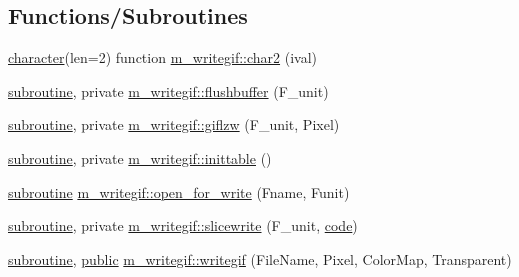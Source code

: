 \subsection*{Functions/\+Subroutines}
\begin{DoxyCompactItemize}
\item 
\hyperlink{option__stopwatch_83_8txt_abd4b21fbbd175834027b5224bfe97e66}{character}(len=2) function \hyperlink{namespacem__writegif_a79ebbfd4c7df8520a82c75c3a62f0c96}{m\+\_\+writegif\+::char2} (ival)
\item 
\hyperlink{M__stopwatch_83_8txt_acfbcff50169d691ff02d4a123ed70482}{subroutine}, private \hyperlink{namespacem__writegif_a48c5ca5487be9dbe565c0d4f8aa02d0d}{m\+\_\+writegif\+::flushbuffer} (F\+\_\+unit)
\item 
\hyperlink{M__stopwatch_83_8txt_acfbcff50169d691ff02d4a123ed70482}{subroutine}, private \hyperlink{namespacem__writegif_a13c09be69495f4ba21ecb7c134216a17}{m\+\_\+writegif\+::giflzw} (F\+\_\+unit, Pixel)
\item 
\hyperlink{M__stopwatch_83_8txt_acfbcff50169d691ff02d4a123ed70482}{subroutine}, private \hyperlink{namespacem__writegif_aed61b15f90188ddf39b71aa0c73a82a8}{m\+\_\+writegif\+::inittable} ()
\item 
\hyperlink{M__stopwatch_83_8txt_acfbcff50169d691ff02d4a123ed70482}{subroutine} \hyperlink{namespacem__writegif_adb045213dd61508ad7dc7e5640fde67d}{m\+\_\+writegif\+::open\+\_\+for\+\_\+write} (Fname, Funit)
\item 
\hyperlink{M__stopwatch_83_8txt_acfbcff50169d691ff02d4a123ed70482}{subroutine}, private \hyperlink{namespacem__writegif_a27e0ec2c6e05428641179bf35762adb7}{m\+\_\+writegif\+::slicewrite} (F\+\_\+unit, \hyperlink{ufpp__overview_81_8txt_a74a0615f2d9c4a398d9126096f8092f8}{code})
\item 
\hyperlink{M__stopwatch_83_8txt_acfbcff50169d691ff02d4a123ed70482}{subroutine}, \hyperlink{M__stopwatch_83_8txt_a2f74811300c361e53b430611a7d1769f}{public} \hyperlink{namespacem__writegif_a02be37849028b2f9484cff1b4285375d}{m\+\_\+writegif\+::writegif} (File\+Name, Pixel, Color\+Map, Transparent)
\end{DoxyCompactItemize}
